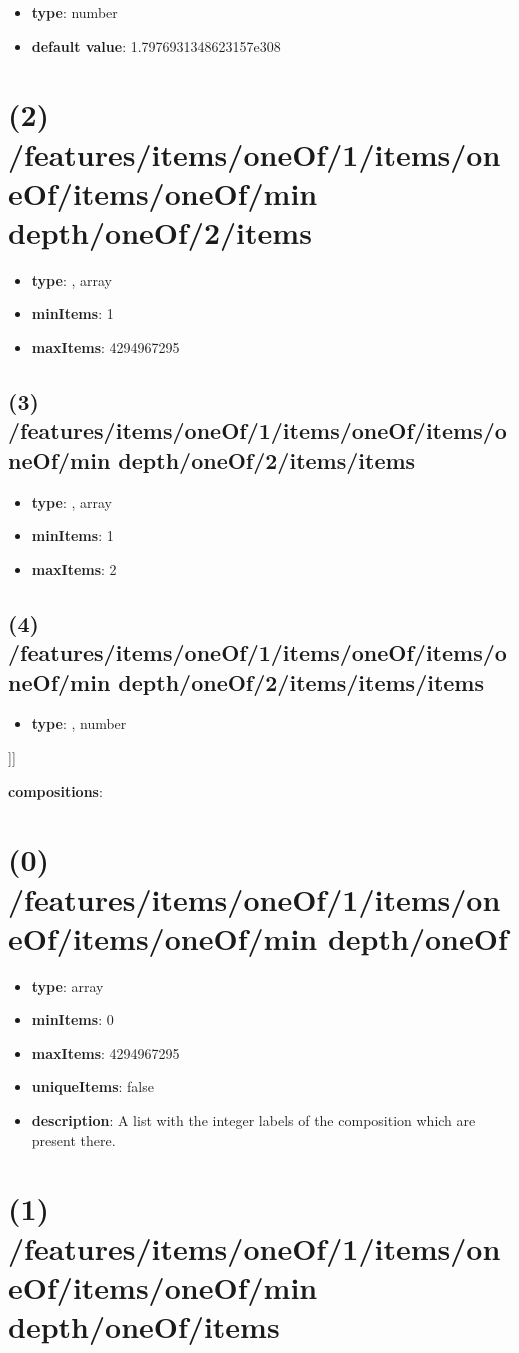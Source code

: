\begin{itemize}[leftmargin=3em]\item {\bf type}: number\item {\bf default value}: 1.7976931348623157e308
\end{itemize}\section{(2) /features/items/oneOf/1/items/oneOf/items/oneOf/min depth/oneOf/2/items}
\begin{itemize}[leftmargin=2em]\item {\bf type}: , array\item {\bf minItems}: 1
\item {\bf maxItems}: 4294967295
\end{itemize}\subsection{(3) /features/items/oneOf/1/items/oneOf/items/oneOf/min depth/oneOf/2/items/items}
\begin{itemize}[leftmargin=3em]\item {\bf type}: , array\item {\bf minItems}: 1
\item {\bf maxItems}: 2
\end{itemize}\subsection{(4) /features/items/oneOf/1/items/oneOf/items/oneOf/min depth/oneOf/2/items/items/items}
\begin{itemize}[leftmargin=4em]\item {\bf type}: , number\end{itemize}]]\item {\bf compositions}: \section{(0) /features/items/oneOf/1/items/oneOf/items/oneOf/min depth/oneOf}
\begin{itemize}[leftmargin=0em]\item {\bf type}: array
\item {\bf minItems}: 0
\item {\bf maxItems}: 4294967295
\item {\bf uniqueItems}: false
\item {\bf description}: A list with the integer labels of the composition which are present there.
\end{itemize}\section{(1) /features/items/oneOf/1/items/oneOf/items/oneOf/min depth/oneOf/items}

